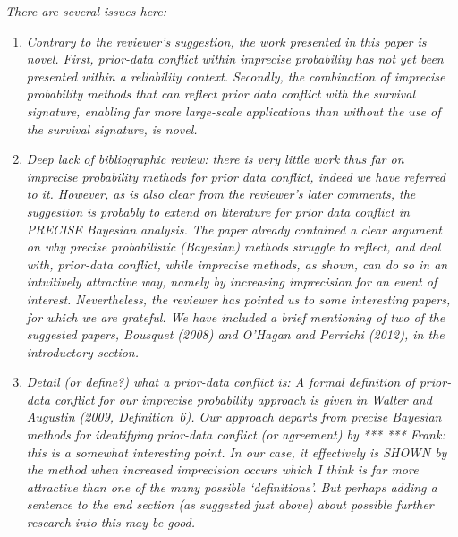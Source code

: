 \documentclass[Journal,SectionNumbers,SingleSpace,InsideFigs]{ascelike}
\begin{document}
\smallskip

\emph{There are several issues here:}
\begin{enumerate}
\item \emph{Contrary to the reviewer's suggestion, the work presented in this paper is novel.
First, prior-data conflict within imprecise probability has not yet been presented within a reliability context.
Secondly, the combination of imprecise probability methods that can reflect prior data conflict with the survival signature,
enabling far more large-scale applications than without the use of the survival signature, is novel.}
\item \emph{Deep lack of bibliographic review:
there is very little work thus far on imprecise probability methods for prior data conflict, indeed we have referred to it.
However, as is also clear from the reviewer's later comments,
the suggestion is probably to extend on literature for prior data conflict in PRECISE Bayesian analysis.
The paper already contained a clear argument on why precise probabilistic (Bayesian) methods struggle to reflect,
and deal with, prior-data conflict, while imprecise methods, as shown, can do so in an intuitively attractive way,
namely by increasing imprecision for an event of interest.
Nevertheless, the reviewer has pointed us to some interesting papers, for which we are grateful.
We have included a brief mentioning of two of the suggested papers,
Bousquet (2008) and O'Hagan and Perrichi (2012), in the introductory section.}
\item \emph{Detail (or define?) what a prior-data conflict is:
A formal definition of prior-data conflict for our imprecise probability approach is given in Walter and Augustin (2009, Definition~6). 
Our approach departs from precise Bayesian methods for identifying prior-data conflict (or agreement)
by *** ***
Frank: this is a somewhat interesting point.
In our case, it effectively is SHOWN by the method when increased imprecision occurs
which I think is far more attractive than one of the many possible `definitions'. But perhaps adding a sentence to the end section (as suggested just above) about possible further research into this may be good.}
\end{enumerate}
\end{document}
